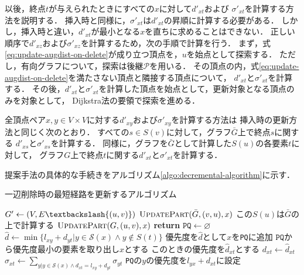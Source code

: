 以後，終点$t$が与えられたときにすべての$x$に対して$d'_{xt}$および
$\sigma'_{xt}$を計算する方法を説明する．
挿入時と同様に，$\sigma'_{xt}$は$d'_{xt}$の昇順に計算する必要がある．
しかし，挿入時と違い，$d'_{xt}$が最小となる$x$を直ちに求めることはできない．
正しい順序で$d'_{xz}$および$\sigma'_{xz}$を計算するため，次の手順で計算を行う．
まず，式\eqref{eq:update-augdist-on-delete}が成り立つ頂点を，$u$を始点として探索する．
ただし，有向グラフについて，探索は後継$\mathcal{P}$を用いる．
その頂点の内，式\eqref{eq:update-augdist-on-delete}を満たさない頂点と隣接する頂点について，
$d'_{xt}$と$\sigma'_{xt}$を計算する．
その後，$d'_{xt}$と$\sigma'_{xt}$を計算した頂点を始点として，更新対象となる頂点のみを対象として，
Dijkstra法の要領で探索を進める．

全頂点ペア$x,y\in V\times V$に対する$d'_{xy}$および$\sigma'_{xy}$を計算する方法は
挿入時の更新方法と同じく次のとおり．
すべての$s\in S(v)$に対して，グラフ$\bar{G}$上で終点$s$に関する
$d'_{xs}$と$\sigma'_{xs}$を計算する．
同様に，グラフを$\bar{G}$として計算した$S(u)$の各要素$t$に対して，
グラフ$G$上で終点$t$に関する$d'_{xt}$と$\sigma'_{xt}$を計算する．

提案手法の具体的な手続きをアルゴリズム\ref{algo:decremental-algorithm}に示す．

\begin{algorithm}[tbp]
  \caption{一辺削除時の最短経路を更新するアルゴリズム}
  \label{algo:decremental-algorithm}
  \begin{multicols}{2}
    \begin{algorithmic}[1]\small
      \State $G'\gets (V,E\textbackslash\{(u,v)\})$
      \State $\textproc{UpdatePart}(\bar{G},(v,u),x)$
      \EndFor
      \State\LeftComment この$S(u)$は$\bar{G}$の上で計算する
      \State $\textproc{UpdatePart}(G,(u,v),x)$
      \EndFor
      \EndProcedure
      \vfill\null
      \columnbreak
      \State \textbf{return}
      \EndIf
      \State $\texttt{PQ}\gets\varnothing$
      \State $\hat{d}\gets\min\{l_{xy}+d_{yt}|y\in\mathcal{S}(x)\land y\notin S(t)\}$
      \State 優先度を$\hat{d}$として$x$を\texttt{PQ}に追加
      \EndIf
      \EndFor
      \State $\texttt{PQ}$から優先度最小の要素を取り出し$x$とする
      \State このときの優先度を$\hat{d}_{xt}$とする
      \State $d_{xt}\gets\hat{d}_{xt}$
      \State $\sigma_{xt}\gets\sum_{y|y\in\mathcal{S}(x)\land d_{xt}=l_{xy}+d_{yt}}\sigma_{yt}$
      \State \texttt{PQ}の$y$の優先度を$l_{yx}+d_{xt}$に設定
      \EndIf
      \EndFor
      \EndWhile
      \EndProcedure
    \end{algorithmic}
  \end{multicols}
\end{algorithm}
